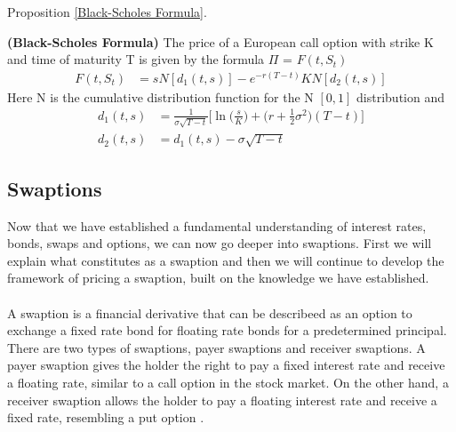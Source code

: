 Proposition \ref{Black-Scholes Formula}.
\begin{proposition}
    \textbf{(Black-Scholes Formula)} The price of a European call option with strike K and time of maturity T 
    is given by the formula $\Pi$ = $F(t,S_t)$
    \begin{align*}
        F(t,S_t) & =s N[d_1(t,s)] -e^{-r(T-t)}KN[d_2(t,s)] 
    \end{align*}
    Here N is the cumulative distribution function for the N $[0,1]$ distribution and 
    \begin{align*}
        d_1(t,s) &= \frac{1}{\sigma \sqrt{T-t}} \Big[ \ln \Big(\frac{s}{K} \Big) +  \Big(r + \frac{1}{2} \sigma^2)(T-t)  \Big] \\
        d_2(t,s) &= d_1(t,s)-\sigma \sqrt{T-t}
    \end{align*}
    \label{Black-Scholes Formula}
    \cite{Bjork}
\end{proposition}
\subsection{Swaptions}
Now that we have established a fundamental understanding of interest rates, bonds, swaps and options, we can
now go deeper into swaptions. First we will explain what constitutes as a swaption and then we will continue 
to develop the framework of pricing a swaption, built on the knowledge we have established.  
\\\\
A swaption is a financial derivative that can be describeed as an option to exchange a fixed rate bond for
floating rate bonds for a predetermined principal. 
There are two types of swaptions, payer swaptions and receiver swaptions.
A payer swaption gives the holder the right to pay a fixed interest rate and receive a floating rate, 
similar to a call option in the stock market. On the other hand, a receiver swaption allows the holder
to pay a floating interest rate and receive a fixed rate, resembling a put option \cite{Lindstrom} .

